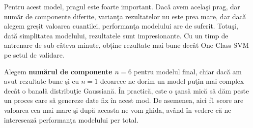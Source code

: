 Pentru acest model, pragul este foarte important. Dacă avem acelaşi prag,
dar număr de componente diferite, varianţa rezultatelor
nu este prea mare, dar dacă alegem greșit valoarea cuantilei, 
performanţa modelului are de suferit. Totuşi, 
dată simplitatea modelului, rezultatele sunt impresionante.
Cu un timp de antrenare de sub câteva minute, obține rezultate 
mai bune decât One Class SVM pe setul de validare.

Alegem \textbf{numărul de componente $n=6$} pentru modelul final, chiar dacă 
am avut rezultate bune şi cu $n=1$ deoarece ne dorim un model puţin mai complex 
decât o banală distribuţie Gaussiană. În practică, este o şansă mică să dăm peste 
un proces care să genereze date fix în acest mod. De asemenea, aici f1 score are valoarea cea mai mare
şi după aceasta ne vom ghida, având în vedere că ne interesează performanţa modelului 
per total.

